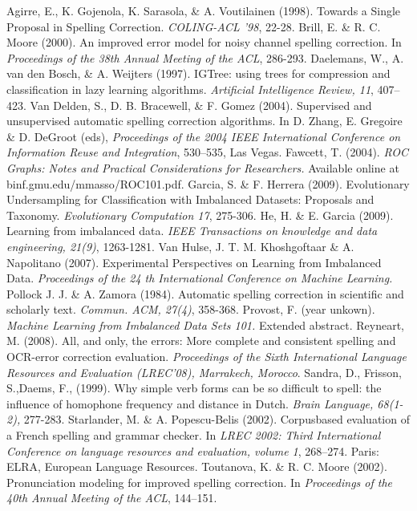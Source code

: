 \documentclass[12pt]{article}
\begin{document}
\begin{thebibliography}{99}

Agirre, E., K. Gojenola, K. Sarasola, \& A. Voutilainen (1998). Towards a Single Proposal in Spelling Correction. \emph{COLING-ACL ’98},  22-28.
Brill, E. \& R. C. Moore (2000). An improved error model for noisy channel spelling correction. In \emph{Proceedings of the 38th Annual Meeting of the ACL}, 286-293.
Daelemans, W., A. van den Bosch, \& A. Weijters (1997). IGTree: using trees for compression and classification in lazy learning algorithms. \emph{Artificial Intelligence Review, 11}, 407–423.
Van Delden, S., D. B. Bracewell, \& F. Gomez (2004). Supervised and unsupervised automatic spelling correction algorithms. In D. Zhang, E. Gregoire \& D. DeGroot (eds), \emph{Proceedings of the 2004 IEEE International Conference on Information Reuse and Integration}, 530–535, Las Vegas.
Fawcett, T. (2004). \emph{ROC Graphs: Notes and Practical Considerations for Researchers.} Available online at binf.gmu.edu/mmasso/ROC101.pdf.
Garcia, S. \& F. Herrera (2009). Evolutionary Undersampling for Classification with Imbalanced Datasets: Proposals and Taxonomy. \emph{Evolutionary Computation 17}, 275-306.
He, H. \& E. Garcia (2009). Learning from imbalanced data. \emph{IEEE Transactions on knowledge and data engineering, 21(9)}, 1263-1281.
Van Hulse, J. T. M. Khoshgoftaar \& A. Napolitano (2007). Experimental Perspectives on Learning from Imbalanced Data. \emph{Proceedings of the 24 th International Conference on Machine Learning.}
Pollock J. J. \& A. Zamora (1984). Automatic spelling correction in scientific and scholarly text. \emph{Commun. ACM, 27(4)}, 358-368.
Provost, F. (year unkown). \emph{Machine Learning from Imbalanced Data Sets 101.} Extended abstract.
Reyneart, M. (2008). All, and only, the errors: More complete and consistent spelling and OCR-error correction evaluation. \emph{Proceedings of the Sixth International Language Resources and Evaluation (LREC’08), Marrakech, Morocco}.
Sandra, D., Frisson, S.,Daems, F., (1999). Why simple verb forms can be so difficult to spell: the influence of homophone frequency and distance in Dutch. \emph{Brain Language, 68(1-2),} 277-283.
Starlander, M. \& A. Popescu-Belis (2002). Corpusbased evaluation of a French spelling and grammar checker. In \emph{LREC 2002: Third International Conference on language resources and evaluation, volume 1}, 268–274. Paris: ELRA, European Language Resources.
Toutanova, K. \& R. C. Moore (2002). Pronunciation modeling for improved spelling correction. In \emph{Proceedings of the 40th Annual Meeting of the ACL}, 144–151.

\end{thebibliography}

\end{document}
